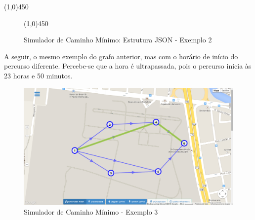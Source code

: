 \begin{center}
  \line(1,0){450}
\end{center}

\begin{figure}[htbp]
  \begin{center}
    \line(1,0){450}
  \end{center}
  \centering
  \caption{Simulador de Caminho Mínimo: Estrutura JSON - Exemplo 2}
  \label{fig:jsondyn2}
\end{figure}
\FloatBarrier

A seguir, o mesmo exemplo do grafo anterior, mas com o horário de início do percurso diferente.
Percebe-se que a hora é ultrapassada, pois o percurso inicia às 23 horas e 50 minutos.

\begin{figure}[htbp]
\centering
 \includegraphics[width=.70\textwidth]{chapters/fig/validacao/ex3.png}
\caption{Simulador de Caminho Mínimo - Exemplo 3}
\label{fig:ex3}
\end{figure}
\FloatBarrier

